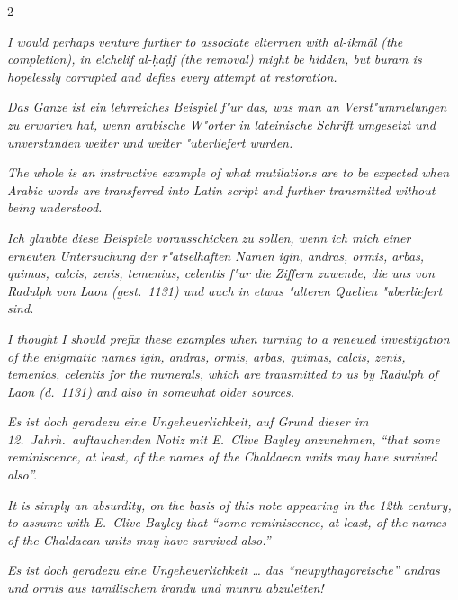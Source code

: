 \documentclass[10pt,a4paper]{article}
\newcommand{\enquote}[1]{``#1''}
\begin{document}
\begin{paracol}{2}
\switchcolumn

\textit{I would perhaps venture further to associate \textit{eltermen} with \textit{al-ikm\=al} (the completion), in \textit{elchelif} \textit{al-\d{h}a\d{d}f} (the removal) might be hidden, but \textit{buram} is hopelessly corrupted and defies every attempt at restoration.}

\switchcolumn*

\textit{Das Ganze ist ein lehrreiches Beispiel f"ur das, was man an Verst"ummelungen zu erwarten hat, wenn arabische W"orter in lateinische Schrift umgesetzt und unverstanden weiter und weiter "uberliefert wurden.}

\switchcolumn

\textit{The whole is an instructive example of what mutilations are to be expected when Arabic words are transferred into Latin script and further transmitted without being understood.}

\switchcolumn*

\textit{Ich glaubte diese Beispiele vorausschicken zu sollen, wenn ich mich einer erneuten Untersuchung der r"atselhaften Namen \textit{igin, andras, ormis, arbas, quimas, calcis, zenis, temenias, celentis} f"ur die Ziffern zuwende, die uns von Radulph von Laon (gest.\ 1131) und auch in etwas "alteren Quellen "uberliefert sind.}

\switchcolumn

\textit{I thought I should prefix these examples when turning to a renewed investigation of the enigmatic names \textit{igin, andras, ormis, arbas, quimas, calcis, zenis, temenias, celentis} for the numerals, which are transmitted to us by Radulph of Laon (d.\ 1131) and also in somewhat older sources.}

\switchcolumn*

\textit{Es ist doch geradezu eine Ungeheuerlichkeit, auf Grund dieser im 12.\ Jahrh.\ auftauchenden Notiz mit E.\ Clive Bayley anzunehmen, \enquote{that some reminiscence, at least, of the names of the Chaldaean units may have survived also}.}

\switchcolumn

\textit{It is simply an absurdity, on the basis of this note appearing in the 12th century, to assume with E.\ Clive Bayley that \enquote{some reminiscence, at least, of the names of the Chaldaean units may have survived also.}}

\switchcolumn*

\textit{Es ist doch geradezu eine Ungeheuerlichkeit \ldots{} das \enquote{neupythagoreische} \textit{andras} und \textit{ormis} aus tamilischem \textit{irandu} und \textit{munru} abzuleiten!}


\end{paracol}
\end{document}

